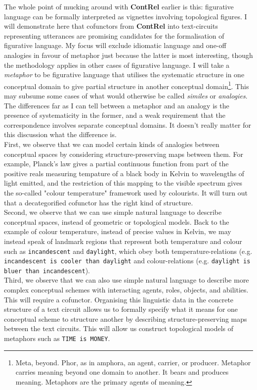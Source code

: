 The whole point of mucking around with \textbf{ContRel} earlier is this: figurative language can be formally interpreted as vignettes involving topological figures. I will demonstrate here that cofunctors from \textbf{ContRel} into text-circuits representing utterances are promising candidates for the formalisation of figurative language. My focus will exclude idiomatic language and one-off analogies in favour of metaphor just because the latter is most interesting, though the methodology applies in other cases of figurative language. I will take a \emph{metaphor} to be figurative language that utilises the systematic structure in one conceptual domain to give partial structure in another conceptual domain\footnote{Meta, beyond. Phor, as in amphora, an agent, carrier, or producer. Metaphor carries meaning beyond one domain to another. It bears and produces meaning. Metaphors are the primary agents of meaning.}. This may subsume some cases of what would otherwise be called \emph{similes} or \emph{analogies}. The differences far as I can tell between a metaphor and an analogy is the presence of systematicity in the former, and a weak requirement that the correspondence involves separate conceptual domains. It doesn't really matter for this discussion what the difference is.\\

First, we observe that we can model certain kinds of analogies between conceptual spaces by considering structure-preserving maps between them. For example, Planck's law gives a partial continuous function from part of the positive reals measuring tempature of a black body in Kelvin to wavelengths of light emitted, and the restriction of this mapping to the visible spectrum gives the so-called "colour temperature" framework used by colourists. It will turn out that a decategorified cofunctor has the right kind of structure.\\

Second, we observe that we can use simple natural language to describe conceptual spaces, instead of geometric or topological models. Back to the example of colour temperature, instead of precise values in Kelvin, we may instead speak of landmark regions that represent both temperature and colour such as \texttt{incandescent} and \texttt{daylight}, which obey both temperature-relations (e.g. \texttt{incandescent is cooler than daylight} and colour-relations (e.g. \texttt{daylight is bluer than incandescent}).\\

Third, we observe that we can also use simple natural language to describe more complex conceptual schemes with interacting agents, roles, objects, and abilities. This will require a cofunctor. Organising this linguistic data in the concrete structure of a text circuit allows us to formally specify what it means for one conceptual scheme to structure another by describing structure-preserving maps between the text circuits. This will allow us construct topological models of metaphors such as \texttt{TIME is MONEY}.\\

